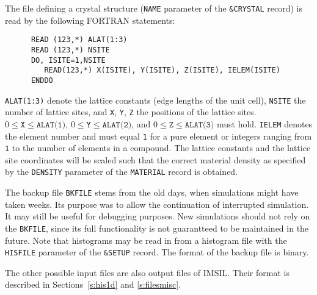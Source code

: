 The file defining a crystal structure (\texttt{NAME} parameter of the
\texttt{\&CRYSTAL} record) is read by the following FORTRAN statements:
%
\begin{verbatim}
      READ (123,*) ALAT(1:3)
      READ (123,*) NSITE
      DO, ISITE=1,NSITE
         READ(123,*) X(ISITE), Y(ISITE), Z(ISITE), IELEM(ISITE)
      ENDDO
\end{verbatim}
%
\texttt{ALAT(1:3)} denote the lattice constants (edge lengths of the unit
cell), \texttt{NSITE} the number of lattice sites, and \texttt{X}, \texttt{Y},
\texttt{Z} the positions of the lattice sites. $0 \le \texttt{X} \le
\texttt{ALAT(1)}$, $0 \le \texttt{Y} \le \texttt{ALAT(2)}$, and $0 \le
\texttt{Z} \le \texttt{ALAT(3)}$ must hold.  \texttt{IELEM} denotes the element
number and must equal \texttt{1} for a pure  element or integers ranging from
\texttt{1} to the number of elements in a  compound. The lattice constants and
the lattice site coordinates  will be scaled such that the correct material
density as specified by the \texttt{DENSITY} parameter of the \texttt{MATERIAL}
record is obtained.

The backup file \texttt{BKFILE} stems from the old days, when simulations might
have taken weeks. Its purpose was to allow the continuation of interrupted
simulation. It may still be useful for debugging purposes. New simulations
should not rely on the \texttt{BKFILE}, since its full functionality is not
guarantteed to be maintained in the future. Note that histograms may be read in
from a histogram file with the \texttt{HISFILE} parameter of the \texttt{\&SETUP}
record. The format of the backup file is binary.

The other possible input files are also output files of IMSIL. Their format is
described in Sections~\ref{s:his1d} and \ref{s:filesmisc}.

